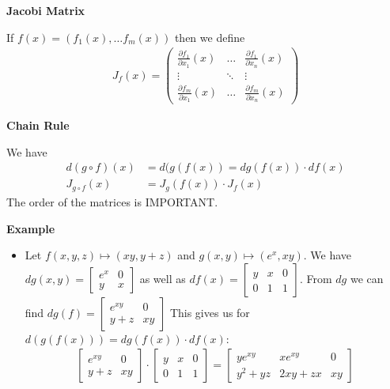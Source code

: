 \documentclass[25pt]{sciposter}
\newenvironment{method}[1]{\begin{mdframed}[backgroundcolor=blue!10,innertopmargin=15pt, innerbottommargin=15pt, nobreak=true]
		\textbf{#1 }
	}
	{ 
	\end{mdframed}
}
\begin{document}
\begin{multicols}{3}
\begin{method}{Jacobi Matrix}
	If $f(x) = (f_1(x),\ldots f_m(x))$ then we define
	\begin{align*}
		J_f(x) = \begin{pmatrix}
		\frac{\partial f_1}{\partial x_1}(x) & \ldots & \frac{\partial f_1}{\partial x_n}(x) \\
		\vdots & \ddots & \vdots \\
		\frac{\partial f_m}{\partial x_1}(x) & \ldots & \frac{\partial f_m}{\partial x_n}(x)	
		\end{pmatrix}
	\end{align*}
\end{method}

\begin{method}{Chain Rule}
	We have 
	\begin{align*}
		d(g \circ f)(x) &= d(g(f(x)) = dg(f(x))\cdot df(x)\\
		J_{g\circ f}(x) &= J_{g}(f(x)) \cdot J_{f} (x)
	\end{align*}
	The order of the matrices is IMPORTANT.
\end{method}
\textbf{Example}
\begin{itemize}
	\item Let $f(x,y,z)\mapsto (xy,y+z)$ and $g(x,y) \mapsto (e^x,xy)$.
	We have $dg(x,y) = \begin{bmatrix}
	e^x & 0 \\ y & x
	\end{bmatrix}$ as well as $df(x) = \begin{bmatrix}
	y & x & 0 \\ 0 & 1 & 1
	\end{bmatrix}$. From $dg$ we can find $dg(f) = \begin{bmatrix}
	e^{xy} & 0 \\ y+z & xy
	\end{bmatrix}$ This gives us for $d(g(f(x))) = dg(f(x))\cdot df(x)$:
	\begin{align*} \begin{bmatrix}
	e^{xy} & 0 \\ y+z & xy
	\end{bmatrix} \cdot \begin{bmatrix}
	y & x & 0 \\ 0 & 1 & 1
	\end{bmatrix} = 
	\begin{bmatrix}
	ye^{xy} & xe^{xy} & 0 \\ y^2+yz & 2xy +zx & xy
	\end{bmatrix}
	\end{align*}
	

\end{itemize}
\end{multicols}
\end{document}
